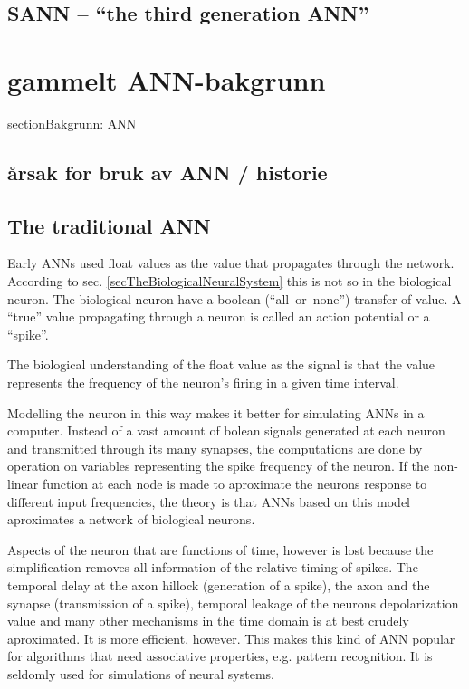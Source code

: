 \subsection{SANN -- ``the third generation ANN''}














\section{gammelt ANN-bakgrunn}
section{Bakgrunn: ANN}
	\subsection{årsak for bruk av ANN / historie}

	\subsection{The traditional ANN}
Early ANNs used float values as the value that propagates through the network. According to sec. \ref{secTheBiologicalNeuralSystem} this is not so in the biological neuron.
The biological neuron have a boolean (``all--or--none'') transfer of value. A ``true'' value propagating through a neuron is called an action potential or a ``spike''.

The biological understanding of the float value as the signal is that the value represents the frequency of the neuron's firing in a given time interval.

Modelling the neuron in this way makes it better for simulating ANNs in a computer. 
Instead of a vast amount of bolean signals generated at each neuron and transmitted through its many synapses, the computations are done by operation on variables representing the spike frequency of the neuron.
If the non-linear function at each node is made to aproximate the neurons response to different input frequencies, the theory is that ANNs based on this model aproximates a network of biological neurons.

Aspects of the neuron that are functions of time, however is lost because the simplification removes all information of the relative timing of spikes.
The temporal delay at the axon hillock (generation of a spike), the axon and the synapse (transmission of a spike), temporal leakage of the neurons depolarization value and many other mechanisms in the time domain is at best crudely aproximated.
It is more efficient, however. This makes this kind of ANN popular for algorithms that need associative properties, e.g. pattern recognition. It is seldomly used for simulations of neural systems.

